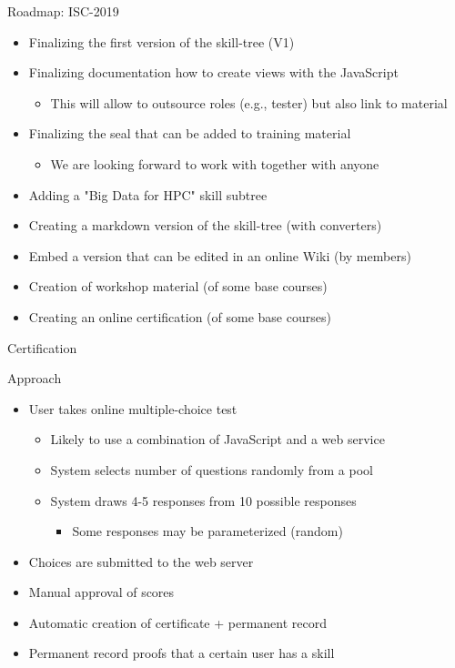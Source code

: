\documentclass[compress,aspectratio=169]{beamer}
\begin{document}
\begin{frame}{Roadmap: ISC-2019}
		\begin{itemize}
			\item Finalizing the first version of the skill-tree (V1)
			\item Finalizing documentation how to create views with the JavaScript
        \begin{itemize}
          \item This will allow to outsource roles (e.g., tester) but also link to material
        \end{itemize}
			\item Finalizing the seal that can be added to training material
			\begin{itemize}
				\item We are looking forward to work with together with anyone
			\end{itemize}
			\item Adding a "Big Data for HPC" skill subtree
      \item Creating a markdown version of the skill-tree (with converters)
      \item Embed a version that can be edited in an online Wiki (by members)
      \item Creation of workshop material (of some base courses)
			\item Creating an online certification (of some base courses)
		\end{itemize}
  \label{frame:last}
\end{frame}


\begin{frame}{Certification}
	\begin{block}{Approach}
		\begin{itemize}
			\item User takes online multiple-choice test
			\begin{itemize}
				\item Likely to use a combination of JavaScript and a web service
				\item System selects number of questions randomly from a pool
				\item System draws 4-5 responses from 10 possible responses
				\begin{itemize}
					\item Some responses may be parameterized (random)
				\end{itemize}
			\end{itemize}
			\item Choices are submitted to the web server
			\item Manual approval of scores
			\item Automatic creation of certificate + permanent record
			\item Permanent record proofs that a certain user has a skill
		\end{itemize}
	\end{block}
\end{frame}
\end{document}
